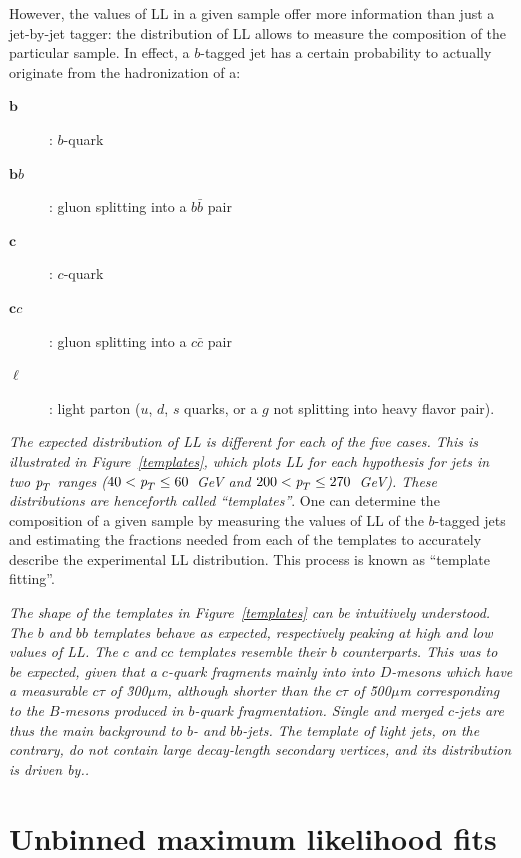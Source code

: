 However, the values of LL in a given sample offer more information than just a jet-by-jet tagger: the distribution of LL allows to measure the composition of the particular sample. In effect, a $b$-tagged jet has a certain probability to actually originate from the hadronization of a:

\begin{description}
\item[$\bm b$]: $b$-quark
\item[$\bm bb$]: gluon splitting into a $b\bar{b}$ pair
\item[$\bm c$]: $c$-quark
\item[$\bm cc$]: gluon splitting into a $c\bar{c}$ pair
\item[$\bm \ell$]: light parton ($u$, $d$, $s$ quarks, or a $g$ not splitting into heavy flavor pair).
\end{description}

\emph{The expected distribution of LL is different for each of the five cases. This is illustrated in Figure~\ref{templates}, which plots LL for each hypothesis for jets in two ${\emph{p}_{T}}$ ranges ($40<{\emph{p}_{T}}\leq60$~GeV and $200<{\emph{p}_{T}}\leq270$~GeV). These distributions are henceforth called ``templates''}. One can determine the composition of a given sample by measuring the values of LL of the $b$-tagged jets and estimating the fractions needed from each of the templates to accurately describe the experimental LL distribution. This process is known as ``template fitting''.

\emph{The shape of the templates in Figure~\ref{templates} can be intuitively understood. The $b$ and $bb$ templates behave as expected, respectively peaking at high and low values of LL. The $c$ and $cc$ templates resemble their $b$ counterparts. This was to be expected, given that a $c$-quark fragments mainly into into $D$-mesons which have a measurable $c\tau$ of \~300$\mu$m, although shorter than the  $c\tau$ of \~500$\mu$m corresponding to the $B$-mesons produced in $b$-quark fragmentation. Single and merged $c$-jets are thus the main background to $b$- and $bb$-jets. The template of light jets, on the contrary, do not contain large decay-length secondary vertices, and its distribution is driven by..}



\section{Unbinned maximum likelihood fits}\label{sec:LLFits}

